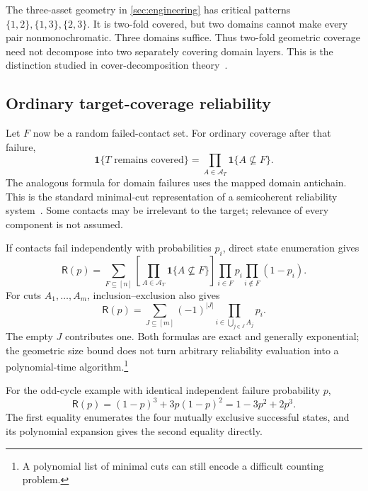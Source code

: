 \begin{example}\label{ex:oddcycle}
The three-asset geometry in \cref{sec:engineering} has critical patterns $\{1,2\},\{1,3\},\{2,3\}$. It is two-fold covered, but two domains cannot make every pair nonmonochromatic. Three domains suffice. Thus two-fold geometric coverage need not decompose into two separately covering domain layers. This is the distinction studied in cover-decomposition theory~\cite{polychromatic}.
\end{example}

\subsection{Ordinary target-coverage reliability}
Let $F$ now be a random failed-contact set. For ordinary coverage after that failure,
\begin{equation}\label{eq:random-success}
\mathbf1\{T\text{ remains covered}\}
=\prod_{A\in\mathcal A_T}\mathbf1\{A\not\subseteq F\}.
\end{equation}
The analogous formula for domain failures uses the mapped domain antichain. This is the standard minimal-cut representation of a semicoherent reliability system~\cite{barlow}. Some contacts may be irrelevant to the target; relevance of every component is not assumed.

If contacts fail independently with probabilities $p_i$, direct state enumeration gives
\begin{equation}\label{eq:reliability-enumeration}
\mathsf R(p)=\sum_{F\subseteq[n]}\left[\prod_{A\in\mathcal A_T}\mathbf1\{A\not\subseteq F\}\right]
\prod_{i\in F}p_i\prod_{i\notin F}(1-p_i).
\end{equation}
For cuts $A_1,\ldots,A_m$, inclusion--exclusion also gives
\begin{equation}\label{eq:reliability-ie}
\mathsf R(p)=\sum_{J\subseteq[m]}(-1)^{|J|}
\prod_{i\in\bigcup_{j\in J}A_j}p_i.
\end{equation}
The empty $J$ contributes one. Both formulas are exact and generally exponential; the geometric size bound does not turn arbitrary reliability evaluation into a polynomial-time algorithm.\footnote{A polynomial list of minimal cuts can still encode a difficult counting problem.}

For the odd-cycle example with identical independent failure probability $p$,
\[
\mathsf R(p)=(1-p)^3+3p(1-p)^2=1-3p^2+2p^3.
\]
The first equality enumerates the four mutually exclusive successful states, and its polynomial expansion gives the second equality directly.

